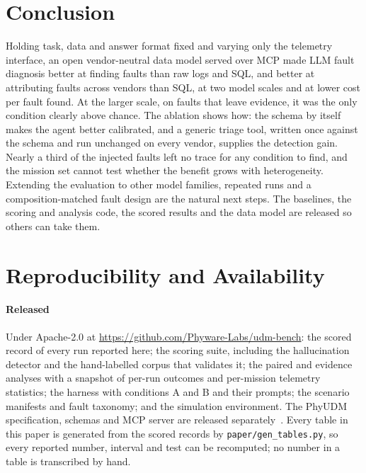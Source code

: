\documentclass[conference]{IEEEtran}
\newcommand{\udm}{PhyUDM}
\newcommand{\condA}{A}
\newcommand{\condB}{B}
\begin{document}
\section{Conclusion}

Holding task, data and answer format fixed and varying only the telemetry
interface, an open vendor-neutral data model served over MCP made LLM fault
diagnosis better at finding faults than raw logs and SQL, and better at
attributing faults across vendors than SQL, at two model scales and at lower cost
per fault found. At the larger scale, on faults that leave evidence, it was the only
condition clearly above chance. The ablation shows how: the schema by itself makes
the agent better calibrated, and a generic triage tool, written once against the
schema and run unchanged on every vendor, supplies the detection gain. Nearly a third of
the injected faults left no trace for any condition to find, and the mission set
cannot test whether the benefit grows with heterogeneity. Extending the evaluation
to other model families, repeated runs and a composition-matched fault design are
the natural next steps. The baselines, the scoring and analysis code, the scored
results and the data model are released so others can take them.

\section*{Reproducibility and Availability}
\paragraph{Released} Under Apache-2.0 at
\url{https://github.com/Phyware-Labs/udm-bench}: the scored record of every run
reported here; the scoring suite, including the hallucination detector and the
hand-labelled corpus that validates it; the paired and evidence analyses with a
snapshot of per-run outcomes and per-mission telemetry statistics; the harness
with conditions \condA{} and \condB{} and their prompts; the scenario manifests and
fault taxonomy; and the simulation environment. The \udm{} specification, schemas
and MCP server are released separately~\cite{phyudm}. Every table in this paper is
generated from the scored records by \texttt{paper/gen\_tables.py}, so every
reported number, interval and test can be recomputed; no number in a table is
transcribed by hand.
\end{document}
